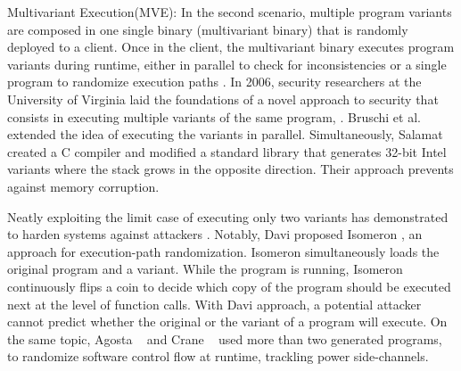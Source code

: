 \begin{usage}{Multivariant Execution(MVE):}
    \label{usage:mve}
    \normalfont
    In the second scenario, multiple program variants are composed in one single binary (multivariant binary) that is randomly deployed to a client. Once in the client, the multivariant binary executes program variants during runtime, either in parallel to check for inconsistencies or a single program to randomize execution paths \cite{bhatkar03}.
    In 2006, security researchers at the University of Virginia laid the foundations of a novel approach to security that consists in executing multiple variants of the same program, \cite{cox06}. Bruschi et al. \cite{bruschi2007diversified} extended the idea of executing the variants in parallel. Simultaneously, Salamat \etal \cite{salamat2007stopping} created a C compiler and modified a standard library that generates 32-bit Intel variants where the stack grows in the opposite direction. Their approach prevents against memory corruption. 
    
    Neatly exploiting the limit case of executing only two variants has demonstrated to harden systems against attackers \cite{salamat2009orchestra, maurer2012tachyon,Kim2015, lu2018stopping}. Notably, Davi \etal proposed Isomeron \cite{davi2015isomeron}, an approach  for execution-path randomization. Isomeron simultaneously loads the original program and a variant. While the program is running, Isomeron continuously flips a coin to decide which copy of the program should be executed next at the level of function calls. With Davi \etal approach, a potential attacker cannot predict whether the original or the variant of a program will execute. On the same topic,
    Agosta \etal~\cite{agosta2015meet} and Crane \etal~\cite{crane2015thwarting} used more than two generated programs, to randomize software control flow at runtime, trackling power side-channels.  
    

    
\end{usage}


